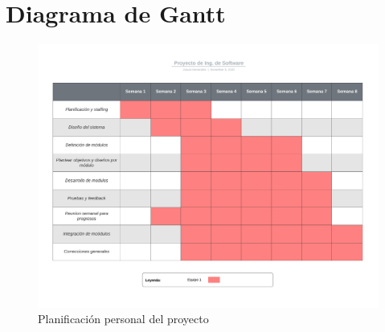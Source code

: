 \documentclass[12pt,twoside]{article}
\begin{document}
\section{Diagrama de Gantt}

\begin{figure}[htb]
    \centering
    \includegraphics[scale=0.17, angle=90]{img/gantt.png}
    \caption{Planificación personal del proyecto}
    \label{fig:gantt}
\end{figure}
\end{document}

